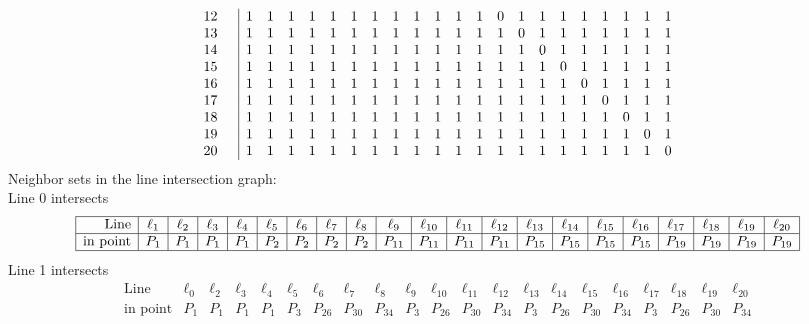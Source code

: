 \documentclass{article}
\begin{document}
{{$$\begin{array}{rr|*{21}r}
12 &  & 1 & 1 & 1 & 1 & 1 & 1 & 1 & 1 & 1 & 1 & 1 & 1 & 0 & 1 & 1 & 1 & 1 & 1 & 1 & 1 & 1\\
13 &  & 1 & 1 & 1 & 1 & 1 & 1 & 1 & 1 & 1 & 1 & 1 & 1 & 1 & 0 & 1 & 1 & 1 & 1 & 1 & 1 & 1\\
14 &  & 1 & 1 & 1 & 1 & 1 & 1 & 1 & 1 & 1 & 1 & 1 & 1 & 1 & 1 & 0 & 1 & 1 & 1 & 1 & 1 & 1\\
15 &  & 1 & 1 & 1 & 1 & 1 & 1 & 1 & 1 & 1 & 1 & 1 & 1 & 1 & 1 & 1 & 0 & 1 & 1 & 1 & 1 & 1\\
16 &  & 1 & 1 & 1 & 1 & 1 & 1 & 1 & 1 & 1 & 1 & 1 & 1 & 1 & 1 & 1 & 1 & 0 & 1 & 1 & 1 & 1\\
17 &  & 1 & 1 & 1 & 1 & 1 & 1 & 1 & 1 & 1 & 1 & 1 & 1 & 1 & 1 & 1 & 1 & 1 & 0 & 1 & 1 & 1\\
18 &  & 1 & 1 & 1 & 1 & 1 & 1 & 1 & 1 & 1 & 1 & 1 & 1 & 1 & 1 & 1 & 1 & 1 & 1 & 0 & 1 & 1\\
19 &  & 1 & 1 & 1 & 1 & 1 & 1 & 1 & 1 & 1 & 1 & 1 & 1 & 1 & 1 & 1 & 1 & 1 & 1 & 1 & 0 & 1\\
20 &  & 1 & 1 & 1 & 1 & 1 & 1 & 1 & 1 & 1 & 1 & 1 & 1 & 1 & 1 & 1 & 1 & 1 & 1 & 1 & 1 & 0\\
\end{array}
$$
}%
Neighbor sets in the line intersection graph:\\
Line 0 intersects 
$$
\begin{array}{|r*{20}{|c}|}
\hline
\mbox{Line}  & \ell_{1} & \ell_{2} & \ell_{3} & \ell_{4} & \ell_{5} & \ell_{6} & \ell_{7} & \ell_{8} & \ell_{9} & \ell_{10} & \ell_{11} & \ell_{12} & \ell_{13} & \ell_{14} & \ell_{15} & \ell_{16} & \ell_{17} & \ell_{18} & \ell_{19} & \ell_{20}\\
\hline
\mbox{in point}  & P_{1} & P_{1} & P_{1} & P_{1} & P_{2} & P_{2} & P_{2} & P_{2} & P_{11} & P_{11} & P_{11} & P_{11} & P_{15} & P_{15} & P_{15} & P_{15} & P_{19} & P_{19} & P_{19} & P_{19}\\
\hline
\end{array}
$$
Line 1 intersects 
$$
\begin{array}{|r*{20}{|c}|}
\hline
\mbox{Line}  & \ell_{0} & \ell_{2} & \ell_{3} & \ell_{4} & \ell_{5} & \ell_{6} & \ell_{7} & \ell_{8} & \ell_{9} & \ell_{10} & \ell_{11} & \ell_{12} & \ell_{13} & \ell_{14} & \ell_{15} & \ell_{16} & \ell_{17} & \ell_{18} & \ell_{19} & \ell_{20}\\
\hline
\mbox{in point}  & P_{1} & P_{1} & P_{1} & P_{1} & P_{3} & P_{26} & P_{30} & P_{34} & P_{3} & P_{26} & P_{30} & P_{34} & P_{3} & P_{26} & P_{30} & P_{34} & P_{3} & P_{26} & P_{30} & P_{34}\\

\end{array}$$}
\end{document}
